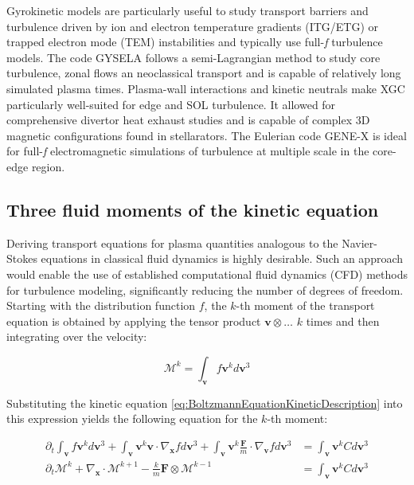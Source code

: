 Gyrokinetic models are particularly useful to study transport barriers and turbulence driven by ion and electron temperature gradients (ITG/ETG) or trapped electron mode (TEM) instabilities and typically use full-\textit{f} turbulence models. The code GYSELA\cite{grandgirard2007global,grandgirard20165d} follows a semi-Lagrangian method to study core turbulence, zonal flows an neoclassical transport and is capable of relatively long simulated plasma times. Plasma-wall interactions and kinetic neutrals make XGC\cite{hager2022} particularly well-suited for edge and SOL turbulence. It allowed for comprehensive divertor heat exhaust studies\cite{chang2017gyrokinetic} and is capable of complex 3D magnetic configurations found in stellarators\cite{cole2019verification}. The Eulerian code GENE-X\cite{goerler2011global,michels2021gene} is ideal for full-\textit{f} electromagnetic simulations of turbulence at multiple scale in the core-edge region. 


\subsection{Three fluid moments of the kinetic equation}
\label{sec:desc_fluidMoments}
Deriving transport equations for plasma quantities analogous to the Navier-Stokes equations in classical fluid dynamics is highly desirable. Such an approach would enable the use of established computational fluid dynamics (CFD) methods for turbulence modeling, significantly reducing the number of degrees of freedom. Starting with the distribution function $f$, the $k$-th moment of the transport equation is obtained by applying the tensor product $\mathbf{v} \otimes \dots$ $k$ times and then integrating over the velocity:

\begin{equation}
	\mathcal{M}^k = \int_\mathbf{v} f\mathbf{v}^k d\mathbf{v}^3
\end{equation}

Substituting the kinetic equation \ref{eq:BoltzmannEquationKineticDescription} into this expression yields the following equation for the $k$-th moment:

\begin{align}
	\partial_t \int_\mathbf{v} f\mathbf{v}^k d\mathbf{v}^3 + \int_\mathbf{v} \mathbf{v}^k \mathbf{v} \cdot \nabla_{\mathbf{x}} f d\mathbf{v}^3 + \int_\mathbf{v} \mathbf{v}^k \frac{\mathbf{F}}{m} \cdot \nabla_{\mathbf{v}} f d\mathbf{v}^3 &= \int_\mathbf{v} \mathbf{v}^k C d\mathbf{v}^3 \nonumber \\
	\partial_t \mathcal{M}^k + \nabla_{\mathbf{x}} \cdot \mathcal{M}^{k+1} - \frac{k}{m} \mathbf{F} \otimes \mathcal{M}^{k-1} &= \int_\mathbf{v} \mathbf{v}^k C d\mathbf{v}^3 \label{eq:desc_generalMomentsEq}
\end{align}

